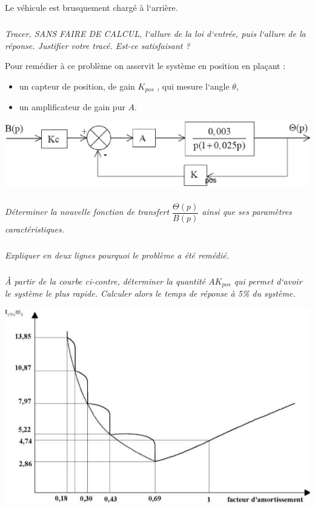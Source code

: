 \documentclass[10pt,fleqn]{article} %
\begin{document}
\begin{multicols}{2}
Le véhicule est brusquement chargé à l‘arrière.

\subparagraph{}
\textit{Tracer, SANS FAIRE DE CALCUL, l‘allure de la loi d‘entrée, puis l‘allure
de la réponse.
Justifier votre tracé. Est-ce satisfaisant ?
}

Pour remédier à ce problème on asservit le système en position en plaçant :
\begin{itemize}
 \item un capteur de position, de gain $K_{pos}$ , qui mesure l‘angle $\theta$,
\item un amplificateur de gain pur $A$.
\end{itemize}

\begin{center}
 \includegraphics[width=.9\linewidth]{images/image1_6}
\end{center}

\subparagraph{}
\textit{Déterminer la nouvelle fonction de transfert $\dfrac{\Theta(p)}{B(p)}$
ainsi que ses paramètres caractéristiques.
}

\subparagraph{}
\textit{Expliquer en deux lignes pourquoi le problème a été remédié.}

\subparagraph{}
\textit{À partir de la courbe ci-contre, déterminer la quantité $AK_{pos}$ qui
permet d‘avoir le système le plus rapide. Calculer alors le temps de réponse à
5\% du système.}

\begin{center}
 \includegraphics[width=\linewidth]{images/image1_7}
\end{center}


\end{multicols}
\end{document}
